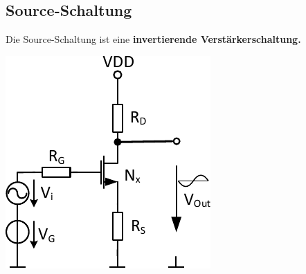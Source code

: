 \subsection{Source-Schaltung}

Die Source-Schaltung ist eine \textbf{invertierende Verstärkerschaltung.}

\smallskip

\begin{minipage}[t]{0.4\columnwidth}
    \includegraphics[width=\columnwidth, align=t]{images/03_source_schaltung.pdf}
\end{minipage}
\hfill

